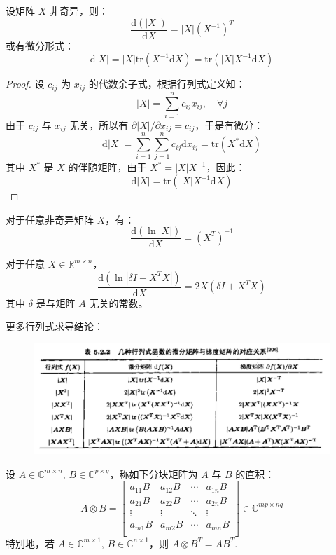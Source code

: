 \begin{example}[行列式求导]
设矩阵 $X$ 非奇异，则：
\[
    \frac{\mathrm d(|X|)}{\mathrm dX}=|X|(X^{-1})^T
\]
或有微分形式：
\[
    \mathrm d|X|=|X|\mathrm{tr}(X^{-1}\mathrm dX)=\mathrm{tr}(|X|X^{-1}\mathrm dX)
\]
\end{example}
\begin{proof}
设 $c_{ij}$ 为 $x_{ij}$ 的代数余子式，根据行列式定义知：
\[
    |X|=\sum_{i=1}^nc_{ij}x_{ij},\quad\forall j
\]
由于 $c_{ij}$ 与 $x_{ij}$ 无关，所以有 $\partial|X|/\partial x_{ij}=c_{ij}$，于是有微分：
\[
    \mathrm d|X|=\sum_{i=1}^n\sum_{j=1}^n c_{ij}\mathrm dx_{ij}=\mathrm{tr}(X^\ast\mathrm dX)
\]
其中 $X^\ast$ 是 $X$ 的伴随矩阵，由于 $X^\ast=|X|X^{-1}$，因此：
\[
    \mathrm d|X|=\mathrm{tr}(|X|X^{-1}\mathrm dX)
\]
\end{proof}

\begin{example}
对于任意非奇异矩阵 $X$，有：
\[
    \frac{\mathrm d(\ln|X|)}{\mathrm dX}=(X^T)^{-1}
\]
\end{example}
\begin{example}
对于任意 $X\in\mathbb R^{m\times n}$，
\[
    \frac{\mathrm d(\ln|\delta I+X^TX|)}{\mathrm dX}=2X(\delta I+X^TX)
\]
其中 $\delta$ 是与矩阵 $A$ 无关的常数。
\end{example}
\begin{example}
更多行列式求导结论：
\begin{figure}[H]
    \centering
    \includegraphics[width=0.9\linewidth]{figs/table2.png}
\end{figure}
\end{example}

\begin{definition}[直积 / Kronecker 积]
设 $A\in\mathbb C^{m\times n},\,B\in\mathbb C^{p\times q}$，称如下分块矩阵为 $A$ 与 $B$ 的直积：
\[
    A\otimes B=\begin{bmatrix}a_{11}B&a_{12}B&\cdots&a_{1n}B\\a_{21}B&a_{22}B&\cdots&a_{2n}B\\\vdots&\vdots&\ddots&\vdots\\a_{m1}B&a_{m2}B&\cdots&a_{mn}B\\\end{bmatrix}\in\mathbb C^{mp\times nq}
\]
特别地，若 $A\in\mathbb C^{m\times 1},\,B\in\mathbb C^{n\times 1}$，则 $A\otimes B^T=AB^T$.
\end{definition}

